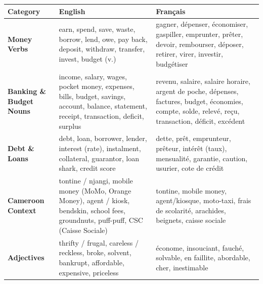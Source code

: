 \documentclass[11pt]{article}
\newcounter{popsec}
\newcounter{popsub}
\newcommand{\courssub}[1]{%
  \stepcounter{popsub}%
  \par\vspace{9pt}\noindent{\popxbold\fontsize{11.5}{13}\selectfont\color{popink}{\color{poporange}\thepopsec.\thepopsub}\hspace{6pt}#1}\par\nopagebreak\vspace{4pt}
}
\begin{document}
\courssub{Thematic Vocabulary}

\begin{definition}
\begin{center}
\begin{tabularx}{\linewidth}{|X|X|X|}
\hline
\rowcolor{popblueL} \textbf{Category} & \textbf{English} & \textbf{Français} \\
\hline
\textbf{Money Verbs} & earn, spend, save, waste, borrow, lend, owe, pay back, deposit, withdraw, transfer, invest, budget (v.) & gagner, dépenser, économiser, gaspiller, emprunter, prêter, devoir, rembourser, déposer, retirer, virer, investir, budgétiser \\
\hline
\textbf{Banking \& Budget Nouns} & income, salary, wages, pocket money, expenses, bills, budget, savings, account, balance, statement, receipt, transaction, deficit, surplus & revenu, salaire, salaire horaire, argent de poche, dépenses, factures, budget, économies, compte, solde, relevé, reçu, transaction, déficit, excédent \\
\hline
\textbf{Debt \& Loans} & debt, loan, borrower, lender, interest (rate), instalment, collateral, guarantor, loan shark, credit score & dette, prêt, emprunteur, prêteur, intérêt (taux), mensualité, garantie, caution, usurier, cote de crédit \\
\hline
\textbf{Cameroon Context} & tontine / njangi, mobile money (MoMo, Orange Money), agent / kiosk, bendskin, school fees, groundnuts, puff-puff, CSC (Caisse Sociale) & tontine, mobile money, agent/kiosque, moto-taxi, frais de scolarité, arachides, beignets, caisse sociale \\
\hline
\textbf{Adjectives} & thrifty / frugal, careless / reckless, broke, solvent, bankrupt, affordable, expensive, priceless & économe, insouciant, fauché, solvable, en faillite, abordable, cher, inestimable \\
\hline
\end{tabularx}
\end{center}
\end{definition}
\end{document}
